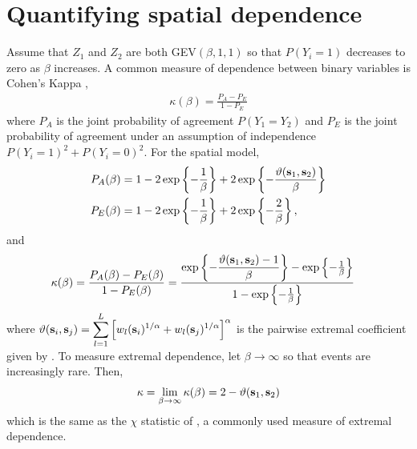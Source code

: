 
\section{Quantifying spatial dependence} \label{rbs:spatdep}
Assume that $Z_1$ and $Z_2$ are both GEV$(\beta, 1, 1)$ so that $P(Y_i = 1)$ decreases to zero as $\beta$ increases.
A common measure of dependence between binary variables is Cohen's Kappa \citep{Cohen1960},
\begin{align}
  \kappa(\beta) = \frac{P_A - P_E}{1 - P_E}
\end{align}
where $P_A$ is the joint probability of agreement $P(Y_1 = Y_2)$ and $P_E$ is the joint probability of agreement under an assumption of independence $P(Y_i = 1)^2 + P(Y_i = 0)^2$.
For the spatial model,
\begin{align*}
  P_A(\beta) &= 1 - 2 \exp\left\{ -\frac{1}{\beta} \right\} + 2 \exp\left\{-\frac{\vartheta(\mathbf{s}_1, \mathbf{s}_2)}{\beta}  \right\} \nonumber \\
  P_E(\beta) &= 1 - 2 \exp \left\{ -\frac{1}{\beta} \right\} + 2 \exp \left\{ -\frac{2}{\beta} \right\}, \nonumber
\end{align*}
and
\begin{align} \label{rbeq:kappa}
  \kappa(\beta) &= \frac{P_A(\beta) - P_E(\beta)}{1 - P_E(\beta)} = \frac{\exp\left\{-\displaystyle\frac{\vartheta(\mathbf{s}_1, \mathbf{s}_2) - 1}{\beta}  \right\} - \exp \left\{ -\frac{1}{\beta} \right\}}{1 - \exp \left\{ -\frac{1}{\beta} \right\}}
\end{align}
where $\vartheta (\mathbf{s}_i, \mathbf{s}_j) = \displaystyle \sum_{ l = 1 }^{ L } \left[ w_{l}(\mathbf{s}_i)^{ 1/\alpha } +  w_{ l}(\mathbf{s}_j)^{ 1/\alpha } \right]^\alpha$ is the pairwise extremal coefficient given by \citet{Reich2012}.
To measure extremal dependence, let $\beta \rightarrow \infty$ so that events are increasingly rare.
Then,
\begin{align}
  \kappa = \lim_{\beta \rightarrow \infty} \kappa(\beta) = 2 - \vartheta(\mathbf{s}_1, \mathbf{s}_2)
\end{align}
which is the same as the $\chi$ statistic of \citet{Coles2001}, a commonly used measure of extremal dependence.

